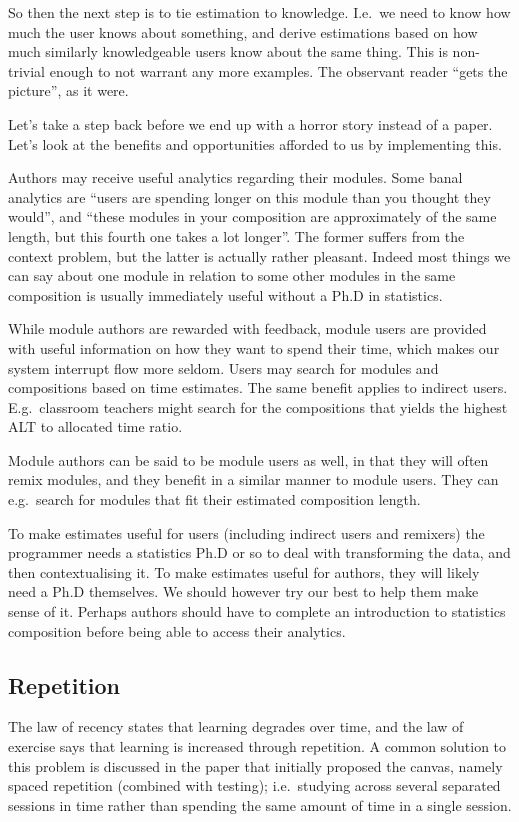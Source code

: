 \documentclass{article}
\begin{document}
\begin{multicols}{2}
So then the next step is to tie estimation to knowledge. I.e.\ we need to know 
how much the user knows about something, and derive estimations based on how 
much similarly knowledgeable users know about the same thing. This is 
non-trivial enough to not warrant any more examples. The observant reader 
``gets the picture'', as it were.

Let's take a step back before we end up with a horror story instead of a 
paper. Let's look at the benefits and opportunities afforded to us by 
implementing this.

Authors may receive useful analytics regarding their modules. Some banal 
analytics are ``users are spending longer on this module than you thought they 
would'', and ``these modules in your composition are approximately of the same 
length, but this fourth one takes a lot longer''. The former suffers from the 
context problem, but the latter is actually rather pleasant. Indeed most 
things we can say about one module in relation to some other modules in the 
same composition is usually immediately useful without a Ph.D in statistics.

While module authors are rewarded with feedback, module users are provided 
with useful information on how they want to spend their time, which makes our 
system interrupt flow more seldom. Users may search for modules and 
compositions based on time estimates. The same benefit applies to indirect 
users. E.g.\ classroom teachers might search for the compositions that yields 
the highest ALT to allocated time ratio.

Module authors can be said to be module users as well, in that they will often 
remix modules, and they benefit in a similar manner to module users. They can 
e.g.\ search for modules that fit their estimated composition length.

To make estimates useful for users (including indirect users and remixers) the 
programmer needs a statistics Ph.D or so to deal with transforming the data, 
and then contextualising it. To make estimates useful for authors, they will 
likely need a Ph.D themselves. We should however try our best to help them 
make sense of it. Perhaps authors should have to complete an introduction to 
statistics composition before being able to access their analytics.
 \subsection{Repetition}
\label{repetition}
The law of recency states that learning degrades over time, and the law of 
exercise says that learning is increased through 
repetition\cite{murphy2011games}. A common solution to this problem is 
discussed in the paper that initially proposed the 
canvas\cite{berntsen2015enabling}, namely spaced repetition (combined with 
testing); i.e.\ studying across several separated sessions in time rather than 
spending the same amount of time in a single session.


\end{multicols}
\end{document}
